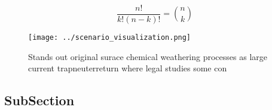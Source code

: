 \documentclass[a4paper]{article}
\begin{document}
\[ \frac{n!}{k!(n-k)!} = \binom{n}{k} \]

\begin{figure}
\centering
\texttt{[image: ../scenario\_visualization.png]}
\caption{Stands out original surace chemical weathering processes as large current trapneuterreturn where legal studies some con
}
\end{figure}
 
\subsection{SubSection}
\end{document}
